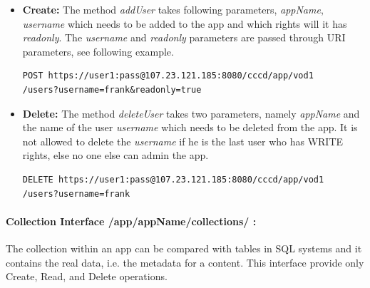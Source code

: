 \begin{itemize}
\item \textbf{Create:} The method \textit{addUser} takes following parameters, \textit{appName}, \textit{username} which needs to be added to the app and which rights will it has \textit{readonly}. The \textit{username} and \textit{readonly} parameters are passed through URI parameters, see following example.

\begin{code}
\begin{verbatim}
POST https://user1:pass@107.23.121.185:8080/cccd/app/vod1
/users?username=frank&readonly=true
\end{verbatim}
\end{code}

\item \textbf{Delete:} The method \textit{deleteUser} takes two parameters, namely \textit{appName} and the name of the user \textit{username} which needs to be deleted from the app. It is not allowed to delete the \textit{username} if he is the last user who has WRITE rights, else no one else can admin the app.

\begin{code}
\begin{verbatim}
DELETE https://user1:pass@107.23.121.185:8080/cccd/app/vod1
/users?username=frank
\end{verbatim}
\end{code}

\end{itemize}

\paragraph{Collection Interface /app/{appName}/collections/ :} The collection within an app can be compared with tables in SQL systems and it contains the real data, i.e. the metadata for a content. This interface provide only Create, Read, and Delete operations. 


